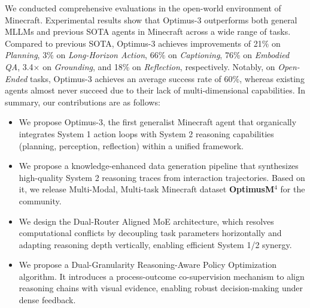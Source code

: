 We conducted comprehensive evaluations in the open-world environment of Minecraft. Experimental results show that Optimus-3 outperforms both general MLLMs and previous SOTA agents in Minecraft across a wide range of tasks. Compared to previous SOTA, Optimus-3 achieves improvements of 21$\%$ on \textit{Planning}, 3$\%$ on \textit{Long-Horizon Action}, 66$\%$ on \textit{Captioning}, 76\% on \textit{Embodied QA}, 3.4$\times$ on \textit{Grounding}, and 18$\%$ on \textit{Reflection}, respectively. Notably, on \textit{Open-Ended} tasks, Optimus-3 achieves an average success rate of 60$\%$, whereas existing agents almost never succeed due to their lack of multi-dimensional capabilities. In summary, our contributions are as follows:
\begin{itemize}
    \item We propose Optimus-3, the first generalist Minecraft agent that organically integrates System 1 action loops with System 2 reasoning capabilities (planning, perception, reflection) within a unified framework. 
    \item We propose a knowledge-enhanced data generation pipeline that synthesizes high-quality System 2 reasoning traces from interaction trajectories. Based on it, we release Multi-Modal, Multi-task Minecraft dataset \textbf{OptimusM$^4$} for the community. 
    \item We design the Dual-Router Aligned MoE architecture, which resolves computational conflicts by decoupling task parameters horizontally and adapting reasoning depth vertically, enabling efficient System 1/2 synergy.
    \item We propose a Dual-Granularity Reasoning-Aware Policy Optimization algorithm. It introduces a process-outcome co-supervision mechanism to align reasoning chains with visual evidence, enabling robust decision-making under dense feedback.
\end{itemize}




